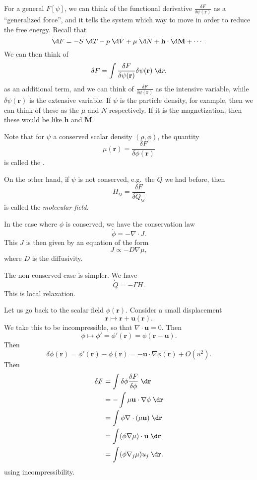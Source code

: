 \documentclass[a4paper]{article}
\begin{document}
For a general $F[\psi]$, we can think of the functional derivative $\frac{\delta F}{\delta \psi(\mathbf{r})}$ as a ``generalized force'', and it tells the system which way to move in order to reduce the free energy. Recall that
\[
  \d F = - S \;\d T - p \;\d V + \mu \;\d N + \mathbf{h} \cdot \d \mathbf{M} + \cdots.
\]
We can then think of
\[
  \delta F = \int \frac{\delta F}{\delta \psi(\mathbf{r})} \delta \psi(\mathbf{r})\;\d r.
\]
as an additional term, and we can think of $\frac{\delta F}{\delta \psi(\mathbf{r})}$ as the intensive variable, while $\delta \psi(\mathbf{r})$ is the extensive variable. If $\psi$ is the particle density, for example, then we can think of these as the $\mu$ and $N$ respectively. If it is the magnetization, then these would be like $\mathbf{h}$ and $\mathbf{M}$.

Note that for $\psi$ a conserved scalar density $(\rho, \phi)$, the quantity
\[
  \mu(\mathbf{r}) = \frac{\delta F}{\delta \phi(\mathbf{r})}
\]
is called the .

On the other hand, if $\psi$ is not conserved, e.g.\ the $Q$ we had before, then
\[
  H_{ij} = \frac{\delta F}{\delta Q_{ij}}
\]
is called the \emph{molecular field}.

In the case where $\phi$ is conserved, we have the conservation law
\[
  \dot{\phi} = - \nabla \cdot J.
\]
This $J$ is then given by an equation of the form
\[
  J \propto -D \nabla \mu,
\]
where $D$ is the diffusivity.

The non-conserved case is simpler. We have
\[
  \dot{Q} = - \Gamma H.
\]
This is local relaxation.

Let us go back to the scalar field $\phi(\mathbf{r})$. Consider a small displacement
\[
  \mathbf{r} \mapsto \mathbf{r} + \mathbf{u}(\mathbf{r}).
\]
We take this to be incompressible, so that $\nabla \cdot \mathbf{u} = 0$. Then
\[
  \phi \mapsto \phi' = \phi'(\mathbf{r}) = \phi(\mathbf{r} - \mathbf{u}).
\]
Then
\[
  \delta \phi(\mathbf{r}) = \phi'(\mathbf{r}) - \phi(\mathbf{r}) = - \mathbf{u} \cdot \nabla \phi(\mathbf{r}) + O(u^2).
\]
Then
\begin{align*}
  \delta F &= \int \delta \phi \frac{\delta F}{\delta \phi}\;\d \mathbf{r} \\
  &= -\int \mu \mathbf{u} \cdot \nabla \phi \;\d \mathbf{r}\\
  &= \int \phi \nabla \cdot (\mu \mathbf{u})\;\d \mathbf{r}\\
  &= \int (\phi \nabla \mu)\cdot \mathbf{u}\;\d \mathbf{r}\\
  &= \int (\phi \nabla_j \mu)u_j\;\d \mathbf{r}.
\end{align*}
using incompressibility.
\end{document}
